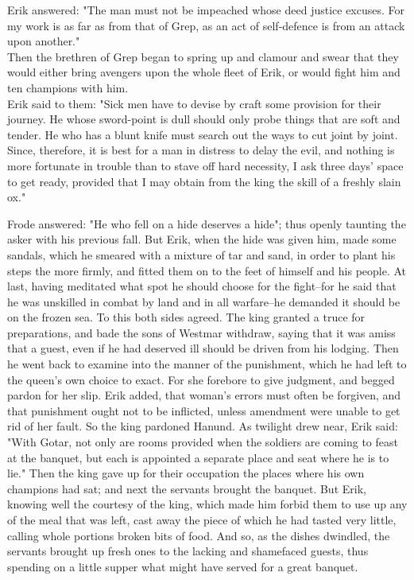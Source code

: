 \documentclass[10pt,a4paper]{report}
\begin{document}
Erik answered: "The man must not be impeached whose deed justice excuses. For my work is as far as from that of Grep, as an act of self-defence is from an attack upon another."\\

Then the brethren of Grep began to spring up and clamour and swear that they would either bring avengers upon the whole fleet of Erik, or would fight him and ten champions with him.\\

Erik said to them: "Sick men have to devise by craft some provision for their journey. He whose sword-point is dull should only probe things that are soft and tender. He who has a blunt knife must search out the ways to cut joint by joint. Since, therefore, it is best for a man in distress to delay the evil, and nothing is more fortunate in trouble than to stave off hard necessity, I ask three days' space to get ready, provided that I may obtain from the king the skill of a freshly slain ox."\

Frode answered: "He who fell on a hide deserves a hide"; thus openly taunting the asker with his previous fall. But Erik, when the hide was given him, made some sandals, which he smeared with a mixture of tar and sand, in order to plant his steps the more firmly, and fitted them on to the feet of himself and his people. At last, having meditated what spot he should choose for the fight--for he said that he was unskilled in combat by land and in all warfare--he demanded it should be on the frozen sea. To this both sides agreed. The king granted a truce for preparations, and bade the sons of Westmar withdraw, saying that it was amiss that a guest, even if he had deserved ill should be driven from his lodging. Then he went back to examine into the manner of the punishment, which he had left to the queen's own choice to exact. For she forebore to give judgment, and begged pardon for her slip. Erik added, that woman's errors must often be forgiven, and that punishment ought not to be inflicted, unless amendment were unable to get rid of her fault. So the king pardoned Hanund. As twilight drew near, Erik said: "With Gotar, not only are rooms provided when the soldiers are coming to feast at the banquet, but each is appointed a separate place and seat where he is to lie." Then the king gave up for their occupation the places where his own champions had sat; and next the servants brought the banquet. But Erik, knowing well the courtesy of the king, which made him forbid them to use up any of the meal that was left, cast away the piece of which he had tasted very little, calling whole portions broken bits of food. And so, as the dishes dwindled, the servants brought up fresh ones to the lacking and shamefaced guests, thus spending on a little supper what might have served for a great banquet.\\
\end{document}
